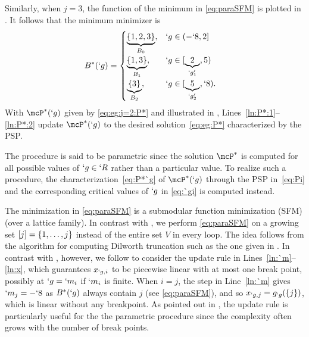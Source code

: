\documentclass[conference,letterpaper]{IEEEtran}
\begin{document}
Similarly, when $j=3$, the function of the minimum in \eqref{eq:paraSFM} is plotted in . It follows that the minimum minimizer is
\begin{align}
	\label{eq:eg:B^*:j=2}
	B^*(`g) &=
	\begin{cases}
		\underbrace{\Set {1,2,3}}_{B_0}, & `g \in (-`8,2]\\
		\underbrace{\Set {1,3}}_{B_1}, & `g\in [\underbrace{2}_{`g'_1},5)\\
		\underbrace{\Set {3}}_{B_2}, & `g\in [\underbrace{5}_{`g'_2},`8).
	\end{cases}
\end{align} 
With $\mcP^*(`g)$ given by \eqref{eq:eg:j=2:P*} and illustrated in ,
Lines~\ref{ln:P*:1}--\ref{ln:P*:2} update $\mcP^*(`g)$ to the desired solution~\eqref{eq:eg:P*}
characterized by the PSP.

The procedure is said to be parametric since the solution $\mcP^*$ is computed for all possible
 values of $`g\in `R$ rather than a particular value. To realize such a procedure, the characterization~\eqref{eq:P*`g} of $\mcP^*(`g)$ through the PSP in~\eqref{eq:Pi} and the corresponding critical values of $`g$ in \eqref{eq:`gi} is computed instead. %

The minimization in \eqref{eq:paraSFM} is a submodular function minimization (SFM) (over a lattice family). In
contrast with \cite{kolmogorov10}, we perform \eqref{eq:paraSFM} on a growing set $[j]=\{1,\dots,j\}$ instead of the entire set $V$ in every loop. The idea follows from the algorithm for computing Dilworth truncation
such as the one given in \cite{schrijver02}. In contrast with \cite{schrijver02}, however, we follow
\cite{kolmogorov10} to
consider the update rule in Lines~\ref{ln:`m}--\ref{ln:x}, which guarantees $x_{`g,i}$ to be piecewise linear with at most one
break point, possibly at $`g=`m_i$ if $`m_i$ is finite. When $i=j$, the step in 
Line~\ref{ln:`m} gives $`m_j=-`8$ as $B^*(`g)$ always contain $j$ (see \eqref{eq:paraSFM}), and so
$x_{`g,j}=g_{`g}(\{j\})$, which is linear without any breakpoint. As pointed out in \cite{kolmogorov10}, the update rule is particularly useful for the the parametric procedure since the complexity often grows with the number of break points. 
\end{document}
